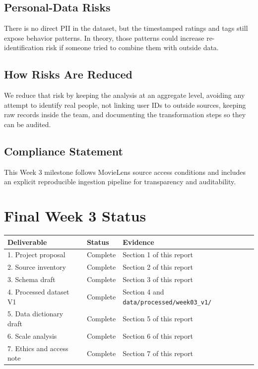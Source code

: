 \documentclass[11pt]{article}
\begin{document}
\subsection{Personal-Data Risks}

There is no direct PII in the dataset, but the timestamped ratings and tags still expose behavior patterns. In theory, those patterns could increase re-identification risk if someone tried to combine them with outside data.

\subsection{How Risks Are Reduced}

We reduce that risk by keeping the analysis at an aggregate level, avoiding any attempt to identify real people, not linking user IDs to outside sources, keeping raw records inside the team, and documenting the transformation steps so they can be audited.

\subsection{Compliance Statement}

This Week 3 milestone follows MovieLens source access conditions and includes an explicit reproducible ingestion pipeline for transparency and auditability.

\section{Final Week 3 Status}

\begin{longtable}{@{}p{}p{}p{}@{}}
\toprule
\textbf{Deliverable} & \textbf{Status} & \textbf{Evidence} \\
\midrule
\endhead
1. Project proposal & Complete & Section 1 of this report \\
2. Source inventory & Complete & Section 2 of this report \\
3. Schema draft & Complete & Section 3 of this report \\
4. Processed dataset V1 & Complete & Section 4 and \texttt{data/processed/week03\_v1/} \\
5. Data dictionary draft & Complete & Section 5 of this report \\
6. Scale analysis & Complete & Section 6 of this report \\
7. Ethics and access note & Complete & Section 7 of this report \\
\bottomrule
\end{longtable}
\end{document}
